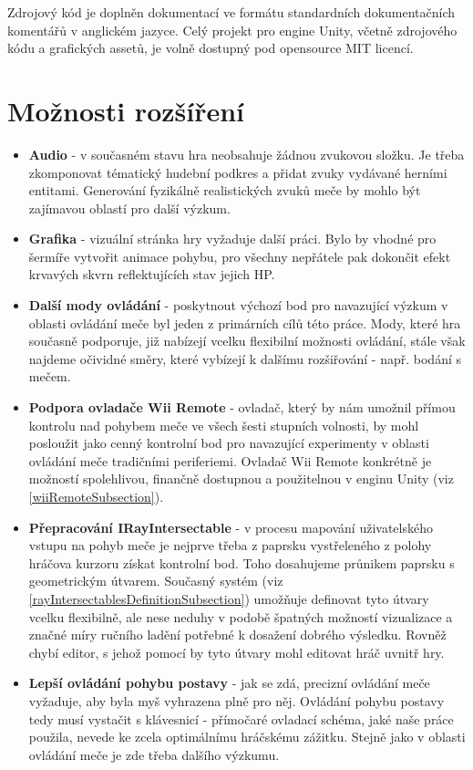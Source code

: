 \bigbreak

Zdrojový kód je doplněn dokumentací ve formátu standardních dokumentačních komentářů v anglickém jazyce. Celý projekt pro engine Unity, včetně zdrojového kódu a grafických assetů, je volně dostupný pod opensource MIT licencí.

\section{Možnosti rozšíření}

\begin{itemize}
    \item \textbf{Audio} - v současném stavu hra neobsahuje žádnou zvukovou složku. Je třeba zkomponovat tématický hudební podkres a přidat zvuky vydávané herními entitami. Generování fyzikálně realistických zvuků meče by mohlo být zajímavou oblastí pro další výzkum. 
    \item \textbf{Grafika} - vizuální stránka hry vyžaduje další práci. Bylo by vhodné pro šermíře vytvořit animace pohybu, pro všechny nepřátele pak dokončit efekt krvavých skvrn reflektujících stav jejich \acs{HP}.
    \item \textbf{Další mody ovládání} - poskytnout výchozí bod pro navazující výzkum v oblasti ovládání meče byl jeden z primárních cílů této práce. Mody, které hra současně podporuje, již nabízejí vcelku flexibilní možnosti ovládání, stále však najdeme očividné směry, které vybízejí k dalšímu rozšiřování - např. bodání s mečem. 
    \item \textbf{Podpora ovladače Wii Remote} - ovladač, který by nám umožnil přímou kontrolu nad pohybem meče ve všech šesti stupních volnosti, by mohl posloužit jako cenný kontrolní bod pro navazující experimenty v oblasti ovládání meče tradičními periferiemi. Ovladač Wii Remote konkrétně je možností spolehlivou, finančně dostupnou a použitelnou v enginu Unity (viz \ref{wiiRemoteSubsection}).
    \item \textbf{Přepracování IRayIntersectable} - v procesu mapování uživatelského vstupu na pohyb meče je nejprve třeba z paprsku vystřeleného z polohy hráčova kurzoru získat kontrolní bod. Toho dosahujeme průnikem paprsku s geometrickým útvarem. Současný systém (viz \ref{rayIntersectablesDefinitionSubsection}) umožňuje definovat tyto útvary vcelku flexibilně, ale nese neduhy v podobě špatných možností vizualizace a značné míry ručního ladění potřebné k dosažení dobrého výsledku. Rovněž chybí editor, s jehož pomocí by tyto útvary mohl editovat hráč uvnitř hry.
    \item \textbf{Lepší ovládání pohybu postavy} - jak se zdá, precizní ovládání meče vyžaduje, aby byla myš vyhrazena plně pro něj. Ovládání pohybu postavy tedy musí vystačit s klávesnicí - přímočaré ovladací schéma, jaké naše práce použila, nevede ke zcela optimálnímu hráčskému zážitku. Stejně jako v oblasti ovládání meče je zde třeba dalšího výzkumu.

\end{itemize}

